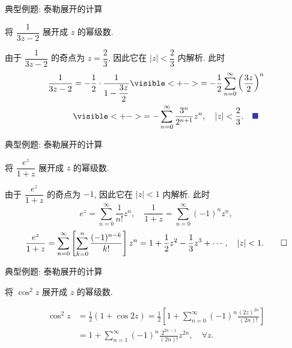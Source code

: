 \begin{frame}{典型例题: 泰勒展开的计算}
\begin{example}
将 $\dfrac1{3z-2}$ 展开成 $z$ 的幂级数.
\end{example}
\begin{solutions}
由于 $\dfrac1{3z-2}$ 的奇点为 $z=\dfrac23$, 因此它在 $|z|<\dfrac23$ 内解析.
\onslide<+->
此时
\begin{align*}
\frac1{3z-2}&=-\frac12\cdot\frac1{1-\dfrac{3z}2}
\visible<+->{=-\frac12\sum_{n=0}^\infty\left(\frac{3z}2\right)^n}\\
&\visible<+->{=-\sum_{n=0}^\infty\frac{3^n}{2^{n+1}}z^n,\quad|z|<\frac23.\mqed}
\end{align*}
\end{solutions}
\end{frame}


\begin{frame}{典型例题: 泰勒展开的计算}
\begin{example}
将 $\dfrac{e^z}{1+z}$ 展开成 $z$ 的幂级数.
\end{example}
\begin{solution}
由于 $\dfrac{e^z}{1+z}$ 的奇点为 $-1$, 因此它在 $|z|<1$ 内解析.
\onslide<+->
此时
\[e^z=\sum_{n=0}^\infty\frac1{n!}z^n,\quad
\frac1{1+z}=\sum_{n=0}^\infty(-1)^nz^n,\]
\onslide<+->
\[\dfrac{e^z}{1+z}=\sum_{n=0}^\infty\left[\sum_{k=0}^n\frac{(-1)^{n-k}}{k!}\right]z^n
=1+\frac12z^2-\frac13z^3+\cdots,\quad|z|<1.\qedhere\]
\end{solution}
\end{frame}


\begin{frame}{典型例题: 泰勒展开的计算}
\begin{exercise}
将 $\cos^2z$ 展开成 $z$ 的幂级数.
\end{exercise}
\vspace{-0.3\baselineskip}
\begin{answer}
\vspace{-\baselineskip}
\begin{align*}
\cos^2z&=\frac12(1+\cos{2z})=\frac12\left[1+\sum_{n=0}^\infty(-1)^n\frac{(2z)^{2n}}{(2n)!}\right]\\
&=1+\sum_{n=1}^\infty(-1)^n\frac{2^{2n-1}}{(2n)!}z^{2n},\quad\forall z.
\end{align*}
\end{answer}
\end{frame}



